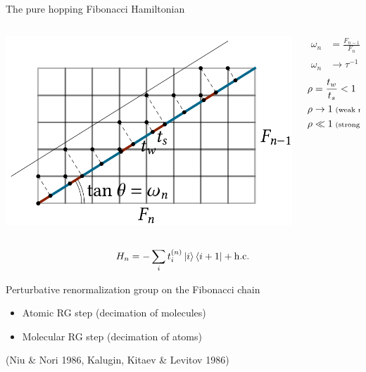 \documentclass[xcolor=x11names,compress,professionalfonts]{beamer}
\renewcommand{\(}{\begin{columns}}
\renewcommand{\)}{\end{columns}}
\newcommand{\<}[1]{\begin{column}{#1}}
\renewcommand{\>}{\end{column}}
\newcommand{\zb}{\ensuremath{\overline{z}}}
\newcommand{\ham}{\ensuremath{H}}
\begin{document}
\begin{frame}{The pure hopping Fibonacci Hamiltonian}
\begin{columns}
\begin{column}{8.5cm}
	\centering
	\includegraphics[scale=.65]{cut_and_project.pdf}
\end{column}

\begin{column}{3cm}
\begin{align*}
\omega_n &= \frac{F_{n-1}}{F_{n}} \\
\omega_n &\rightarrow \tau^{-1} = \frac{\sqrt{5}-1}{2}
\end{align*}
\begin{align*}
\rho &= \frac{t_w}{t_s} < 1 \\
\rho &\rightarrow 1 \scriptsize{\text{ (weak modulation)}} \\
\rho &\ll 1 \scriptsize{\text{ (strong modulation)}}
\end{align*}
\end{column}
\end{columns}

	\[ \ham_n = - \sum_i t_i^{(n)} \ket{i} \bra{i+1} + \text{h.c.} \]
\end{frame}

\begin{frame}{Perturbative renormalization group on the Fibonacci chain}
	\centering
	\begin{itemize}
	\item Atomic RG step (decimation of molecules) 
	\item Molecular RG step (decimation of atoms) 
	\end{itemize}
	\begin{flushright}
	\onslide<2>{$z= \rho/2$, $\zb = \rho^2$} (Niu \& Nori 1986, Kalugin, Kitaev \& Levitov 1986)
	\end{flushright}
\end{frame}
\end{document}
